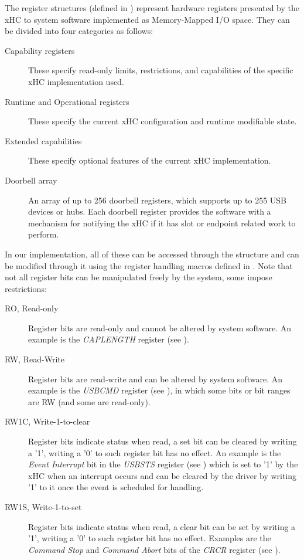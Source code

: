 The register structures (defined in )
represent hardware registers presented by the xHC to system software
implemented as Memory-Mapped I/O space. They can be divided into four categories as follows:
~
\begin{description}
	\item[Capability registers]
		These specify read-only limits, restrictions, and capabilities of the specific
		xHC implementation used.
	\item[Runtime and Operational registers]
		These specify the current xHC configuration and runtime modifiable state.
	\item[Extended capabilities]
		These specify optional features of the current xHC implementation.
	\item[Doorbell array]
		An array of up to 256 doorbell registers, which supports up to 255 USB devices
		or hubs. Each doorbell register provides the software with a mechanism for
		notifying the xHC if it has slot or endpoint related work to perform.
\end{description}

In our implementation, all of these can be accessed through the  structure and
can be modified through it using the register handling macros defined in
. Note that not all register bits can be
manipulated freely by the system, some impose restrictions:
~
\begin{description}
	\item[RO, Read-only]
		Register bits are read-only and cannot be altered by system software. An example
		is the \textit{CAPLENGTH} register (see ).
	\item[RW, Read-Write]
		Register bits are read-write and can be altered by system software. An example
		is the \textit{USBCMD} register (see ), in which some bits or bit ranges
		are RW (and some are read-only).
	\item[RW1C, Write-1-to-clear]
		Register bits indicate status when read, a set bit can be cleared by writing
		a '1', writing a '0' to such register bit has no effect. An example is
		the \textit{Event Interrupt} bit in the \textit{USBSTS} register (see ) which is set
		to '1' by the xHC when an interrupt occurs and can be cleared by the driver
		by writing '1' to it once the event is scheduled for handling.
	\item[RW1S, Write-1-to-set]
		Register bits indicate status when read, a clear bit can be set by writing
		a '1', writing a '0' to such register bit has no effect. Examples are the
		\textit{Command Stop} and \textit{Command Abort} bits of the \textit{CRCR} register
		(see ).
\end{description}

